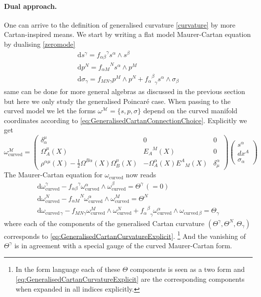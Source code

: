 \documentclass[11pt,a4paper]{article}
\numberwithin{equation}{section}
\newcommand{\diff}{\mathrm{d}}
\begin{document}
\paragraph{Dual approach.} One can arrive to the definition of generalised curvature \eqref{curvature} by more Cartan-inspired means. We start by writing a flat model Maurer-Cartan equation by dualising \eqref{zeromode}  
\begin{gather}
    \diff s^{\gamma} = {f_{\alpha \beta}}^\gamma s^{\alpha} \wedge s^{\beta} \nonumber
    \\
    \diff p^N = {f_{\alpha M}}^N s^{\alpha} \wedge p^M
    \\
    \diff \sigma_{\gamma} = {f_{ M N \gamma}} p^M \wedge p^N +  {{f_{\alpha}}^{\beta}}_\gamma s^{\alpha} \wedge \sigma_{\beta} \nonumber
\end{gather}
same can be done for more general algebras as discussed in the previous section but here we only study the generalised Poincar\'e case. When passing to the curved model we let the forms $\omega^{\mathcal{M}} = \{s,p,\sigma\}$ depend on the curved manifold coordinates according to 
 \eqref{eq:GeneralisedCartanConnectionChoice}.
 Explicitly we get
  \begin{equation} 
 \omega_{\text{curved}}^{\mathcal{M}} = \left( \begin{array}{ccc} \delta_\alpha^\mu & 0 & 0 \\ \Omega_A^\mu(X) & {E_A}^M(X) & 0 \\ \rho^{\alpha \mu}(X) - \frac{1}{2} \Omega^{B\alpha}(X) \Omega_B^\mu(X) & - \Omega^{\alpha}_A(X) {E^A}_M(X) & \delta^\alpha_\mu
	\end{array} \right) 
	\begin{pmatrix}
	s^{\alpha} \\ dx^A \\ \sigma_{\alpha}
	\end{pmatrix}
\end{equation}
The Maurer-Cartan equation for $\omega_{\text{curved}}$ now reads
\begin{gather}
    \diff \omega_{\text{curved}}^{\gamma} - {f_{\alpha \beta}}^\gamma \omega_{\text{curved}}^{\alpha} \wedge \omega_{\text{curved}}^{\beta} =\Theta^{\gamma} \, (=0) \nonumber
    \\
    \diff \omega_{\text{curved}}^N - {f_{\alpha M}}^N \omega_{\text{curved}}^{\alpha} \wedge \omega_{\text{curved}}^M = \Theta^N
    \\
    \diff \omega_{\text{curved}\, \gamma} - {f_{ M N \gamma}} \omega_{\text{curved}}^M \wedge \omega_{\text{curved}}^N +  {{f_{\alpha}}^{\beta}}_\gamma \omega_{\text{curved}}^{\alpha} \wedge \omega_{\text{curved}\, \beta} = \Theta_{\gamma} \nonumber
\end{gather}
where each of the components of the generalised Cartan curvature $(\Theta^{\gamma},\Theta^{N},\Theta_{\gamma})$ corresponds to \eqref{eq:GeneralisedCartanCurvatureExplicit}. \footnote{In the form language each of these $\Theta$ components is seen as a two form and \eqref{eq:GeneralisedCartanCurvatureExplicit} are the corresponding components when expanded in all indices explicitly. } And the vanishing of $\Theta^{\gamma}$ is in agreement with a special gauge of the curved Maurer-Cartan form.
\end{document}
